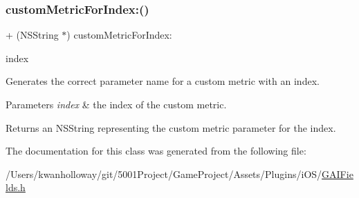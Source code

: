 \subsubsection{\texorpdfstring{custom\+Metric\+For\+Index\+:()}{customMetricForIndex:()}}
{\footnotesize\ttfamily + (N\+S\+String $\ast$) custom\+Metric\+For\+Index\+: \begin{DoxyParamCaption}\item[{(N\+S\+U\+Integer)}]{index }\end{DoxyParamCaption}}

Generates the correct parameter name for a custom metric with an index.


\begin{DoxyParams}{Parameters}
{\em index} & the index of the custom metric.\\
\hline
\end{DoxyParams}
\begin{DoxyReturn}{Returns}
an N\+S\+String representing the custom metric parameter for the index. 
\end{DoxyReturn}


The documentation for this class was generated from the following file\+:\begin{DoxyCompactItemize}
\item 
/\+Users/kwanholloway/git/5001\+Project/\+Game\+Project/\+Assets/\+Plugins/i\+O\+S/\hyperlink{_g_a_i_fields_8h}{G\+A\+I\+Fields.\+h}\end{DoxyCompactItemize}
